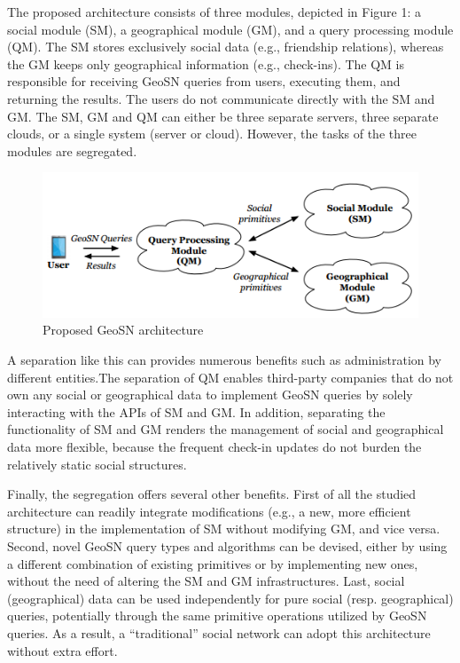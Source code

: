 \documentclass[prodmode,acmtods]{acmsmall} %
\begin{document}
The proposed architecture consists of three modules, depicted in
Figure 1: a social module (SM), a geographical module (GM), and
a query processing module (QM). The SM stores exclusively social
data (e.g., friendship relations), whereas the GM keeps only
geographical information (e.g., check-ins). The QM is responsible
for receiving GeoSN queries from users, executing them, and returning
the results. The users do not communicate directly with the
SM and GM. The SM, GM and QM can either be three separate
servers, three separate clouds, or a single system (server or cloud).
However, the tasks of the three modules are segregated.

\begin{figure}[h]
\centering
\includegraphics[width=0.7\linewidth]{./graphics/geoSNArchitecture}
\caption{Proposed GeoSN architecture}
\label{fig:geoSNArchitecture}
\end{figure}

A separation like this can provides numerous benefits such as administration by
different entities.The separation of QM enables third-party companies that do not own
any social or geographical data to implement GeoSN queries by
solely interacting with the APIs of SM and GM. In addition, separating the functionality of SM and GM renders
the management of social and geographical data more flexible, because
the frequent check-in updates do not burden the relatively
static social structures.

Finally, the segregation offers several other benefits. First of all the studied
architecture can readily integrate modifications (e.g., a new, more
efficient structure) in the implementation of SM without modifying
GM, and vice versa. Second, novel GeoSN query types and
algorithms can be devised, either by using a different combination
of existing primitives or by implementing new ones, without the
need of altering the SM and GM infrastructures. Last, social (geographical)
data can be used independently for pure social (resp.
geographical) queries, potentially through the same primitive operations
utilized by GeoSN queries. As a result, a “traditional” social
network can adopt this architecture without extra effort.
\end{document}
